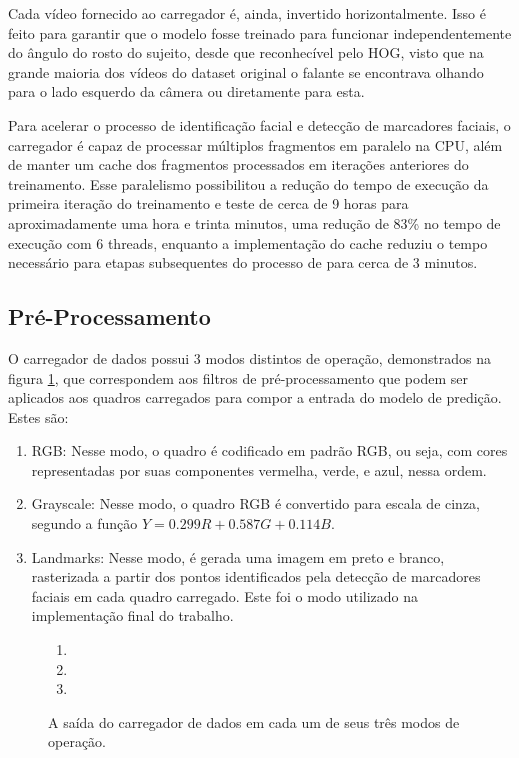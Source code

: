 Cada vídeo fornecido ao carregador é, ainda, invertido horizontalmente.
Isso é feito para garantir que o modelo fosse treinado para funcionar independentemente do ângulo do rosto do sujeito, desde que reconhecível pelo HOG, visto que na grande maioria dos vídeos do dataset original o falante se encontrava olhando para o lado esquerdo da câmera ou diretamente para esta.

Para acelerar o processo de identificação facial e detecção de marcadores faciais, o carregador é capaz de processar múltiplos fragmentos em paralelo na CPU, além de manter um cache dos fragmentos processados em iterações anteriores do treinamento.
Esse paralelismo possibilitou a redução do tempo de execução da primeira iteração do treinamento e teste de cerca de 9 horas para aproximadamente uma hora e trinta minutos, uma redução de 83\% no tempo de execução com 6 threads, enquanto a implementação do cache reduziu o tempo necessário para etapas subsequentes do processo de para cerca de 3 minutos.

\subsection{Pré-Processamento}
\label{sec:pre-processing}

O carregador de dados possui 3 modos distintos de operação, demonstrados na figura \ref{fig:generator_out}, que correspondem aos filtros de pré-processamento que podem ser aplicados aos quadros carregados para compor a entrada do modelo de predição. Estes são:

\begin{enumerate}[label={(\arabic*)}]
    \item RGB: Nesse modo, o quadro é codificado em padrão RGB, ou seja, com cores representadas por suas componentes vermelha, verde, e azul, nessa ordem.
    \item Grayscale: Nesse modo, o quadro RGB é convertido para escala de cinza, segundo a função $Y = 0.299 R + 0.587 G + 0.114 B$.
    \item Landmarks: Nesse modo, é gerada uma imagem em preto e branco, rasterizada a partir dos pontos identificados pela detecção de marcadores faciais em cada quadro carregado. Este foi o modo utilizado na implementação final do trabalho.
\end{enumerate}

\begin{figure}[ht]
    \centering
    \begin{enumerate}[label={(\arabic*)}]
        \item \parbox{\linewidth}{\centering
            
        }
        \item \parbox{\linewidth}{\centering
            
        }
        \item \parbox{\linewidth}{\centering
            
        }
    \end{enumerate}
    \caption{A saída do carregador de dados em cada um de seus três modos de operação.}
    \label{fig:generator_out}
\end{figure}

